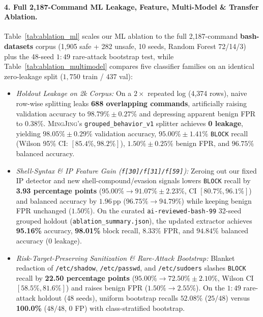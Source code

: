 \documentclass[10pt,twocolumn,letterpaper]{article}
\newcommand{\sys}{\textsc{MingJing}}
\newcommand{\code}[1]{\texttt{\small #1}}
\begin{document}
\paragraph{4. Full 2,187-Command ML Leakage, Feature, Multi-Model \& Transfer Ablation.}
Table~\ref{tab:ablation_ml} scales our ML ablation to the full 2,187-command \textbf{bash-datasets} corpus (1,905 safe + 282 unsafe, 10 seeds, Random Forest 72/14/3) plus the 48-seed $1:49$ rare-attack bootstrap test, while Table~\ref{tab:ablation_multimodel} compares five classifier families on an identical zero-leakage split ($1{,}750$ train / $437$ val):
\begin{itemize}
  \item \emph{Holdout Leakage on 2k Corpus:} On a $2\times$ repeated log (4,374 rows), naive row-wise splitting leaks \textbf{688 overlapping commands}, artificially raising validation accuracy to $98.79\% \pm 0.27\%$ and depressing apparent benign FPR to $0.38\%$. \sys{}'s \code{grouped\_behavior\_v1} splitter achieves \textbf{0 leakage}, yielding $98.05\% \pm 0.29\%$ validation accuracy, $95.00\% \pm 1.41\%$ \code{BLOCK} recall (Wilson 95\% CI: $[85.4\%, 98.2\%]$), $1.50\% \pm 0.25\%$ benign FPR, and $96.75\%$ balanced accuracy.
  \item \emph{Shell-Syntax \& IP Feature Gain (\code{f[30]/f[31]/f[59]}):} Zeroing out our fixed IP detector and new shell-compound/evasion signals lowers \code{BLOCK} recall by \textbf{3.93 percentage points} ($95.00\% \to 91.07\% \pm 2.23\%$, CI $[80.7\%, 96.1\%]$) and balanced accuracy by $1.96\,$pp ($96.75\% \to 94.79\%$) while keeping benign FPR unchanged ($1.50\%$). On the curated \code{ai-reviewed-bash-99} 32-seed grouped holdout (\code{ablation\_summary.json}), the updated extractor achieves \textbf{95.16\%} accuracy, \textbf{98.01\%} block recall, $8.33\%$ FPR, and $94.84\%$ balanced accuracy ($0$ leakage).
  \item \emph{Risk-Target-Preserving Sanitization \& Rare-Attack Bootstrap:} Blanket redaction of \code{/etc/shadow}, \code{/etc/passwd}, and \code{/etc/sudoers} slashes \code{BLOCK} recall by \textbf{22.50 percentage points} ($95.00\% \to 72.50\% \pm 2.10\%$, Wilson CI $[58.5\%, 81.6\%]$) and raises benign FPR ($1.50\% \to 2.55\%$). On the $1:49$ rare-attack holdout (48 seeds), uniform bootstrap recalls $52.08\%$ ($25/48$) versus \textbf{100.0\%} ($48/48$, $0$ FP) with class-stratified bootstrap.

\end{itemize}
\end{document}

